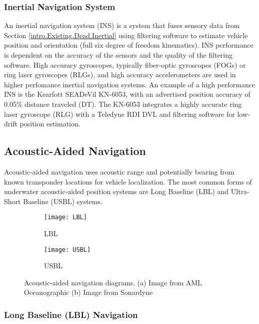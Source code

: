 \subsubsection{Inertial Navigation System}

An inertial navigation system (INS) is a system that fuses sensory data from Section \ref{intro.Existing.Dead.Inertial} using filtering software to estimate vehicle position and orientation (full six degree of freedom kinematics). INS performance is dependent on the accuracy of the sensors and the quality of the filtering software.  High accuracy gyroscopes, typically fiber-optic gyroscopes (FOGs) or ring laser gyroscopes (RLGs), and high accuracy accelerometers are used in higher perfomance inertial navigation systems.  An example of a high performance INS is the Kearfott SEADeVil KN-6053, with an advertised position accuracy of 0.05\% distance traveled (DT).  The KN-6053 integrates a highly accurate ring laser gyroscope (RLG) with a Teledyne RDI DVL and filtering software for low-drift position estimation. 

\subsection{Acoustic-Aided Navigation}
\label{intro.Existing.Acoustic}

Acoustic-aided navigation uses acoustic range and potentially bearing from known transponder locations for vehicle localization.  The most common forms of underwater acoustic-aided position systems are Long Baseline (LBL) and Ultra-Short Baseline (USBL) systems.  

\begin{figure}[!h!]
	\centering
	\begin{subfigure}[b]{0.49\textwidth}
		\texttt{[image: LBL]}
		\caption{LBL}
		\label{fig:lbl}
 	 \end{subfigure}
 	 \hspace{5ex}
  	\centering
	\begin{subfigure}[b]{0.43\textwidth}
                \texttt{[image: USBL]}
                \caption{USBL}
                \label{fig:usbl}
  	\end{subfigure}
  	\caption{Acoustic-aided navigation diagrams. (a) Image from AML Oceanographic (b) Image from Sonardyne}
  	\label{fig:acousticAided}
\end{figure}

\subsubsection{Long Baseline (LBL) Navigation}
\label{intro.Existing.Acoustic.LBL}


